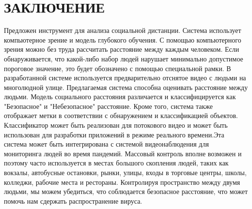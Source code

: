 \chapter*{ЗАКЛЮЧЕНИЕ}    

Предложен инструмент для анализа социальной дистанции. Система использует компьютерное зрение и модель глубокого обучения. С помощью компьютерного зрения можно без труда рассчитать расстояние между каждым человеком. Если обнаруживается, что какой-либо набор людей нарушает минимально допустимое пороговое значение, это будет обозначено с помощью специальной рамки. В разработанной системе используется предварительно отснятое видео с людьми на многолюдной улице. Предлагаемая система способна оценивать расстояние между людьми. Модель социального расстояния различается и классифицируется как "Безопасное" и "Небезопасное" расстояние. Кроме того, система также отображает метки в соответствии с обнаружением и классификацией объектов. Классификатор может быть реализован для потокового видео и может быть использован для разработки приложений в режиме реального времени.Эта система может быть интегрирована с системой видеонаблюдения для мониторинга людей во время пандемий.  Массовый контроль вполне возможен и поэтому часто используется в местах большого скопления людей, таких как вокзалы, автобусные остановки, рынки, улицы, входы в торговые центры, школы, колледжи, рабочие места и рестораны. Контролируя пространство между двумя людьми, мы можем убедиться, что соблюдается безопасное расстояние, что может помочь нам сдержать распространение вируса.

\newpage
